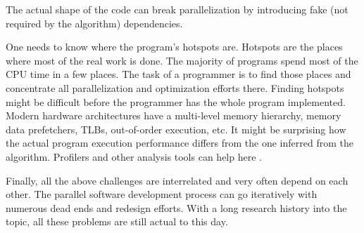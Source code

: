 \begin{description}[style=unboxed,leftmargin=0cm]
The actual shape of the code can break parallelization by introducing fake (not required by the algorithm) dependencies.
\item[Performance analysis and tuning] One needs to know where the program's hotspots are. Hotspots are the places where most of the real work is done. The majority of programs spend most of the CPU time in a few places. The task of a programmer is to find those places and concentrate all parallelization and optimization efforts there. Finding hotspots might be difficult before the programmer has the whole program implemented. Modern hardware architectures have a multi-level memory hierarchy, memory data prefetchers, TLBs, out-of-order execution, etc. It might be surprising how the actual program execution performance differs from the one inferred from the algorithm. Profilers and other analysis tools can help here \cite{perf-tool}.
\end{description}
\quad Finally, all the above challenges are interrelated and very often depend on each other. The parallel software development process can go iteratively with numerous dead ends and redesign efforts. With a long research history into the topic, all these problems are still actual to this day.
